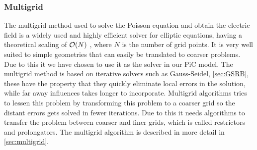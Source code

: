     \subsubsection{Multigrid}

        The multigrid method used to solve the Poisson equation and obtain the
        electric field is a widely used and highly efficient solver for elliptic equations,
        having a theoretical scaling of \(\order{N}\) \citep{press_numerical_1988},
        where \(N\) is the number of grid points. It is very well suited to simple geometries
        that can easily be translated to coarser problems. Due to this it we have chosen
        to use it as the solver in our PiC model.
        The multigrid method is based on iterative
        solvers such as Gauss-Seidel, \cref{sec:GSRB}, these have the property
        that they quickly eliminate local errors in the solution, while far
        away influences takes longer to incorporate. Multigrid algorithms tries
        to lessen this problem by transforming this problem to a coarser grid
        so the distant errors gets solved in fewer iterations. Due to this it needs
        algorithms to transfer the problem between coarser and finer grids, which
        is called restrictors and prolongators. The multigrid algorithm is described in
        more detail in \cref{sec:multigrid}.
